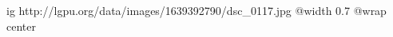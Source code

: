  
 
 
 
 

\ifcmt
  ig http://lgpu.org/data/images/1639392790/dsc_0117.jpg
  @width 0.7
	@wrap center
\fi

